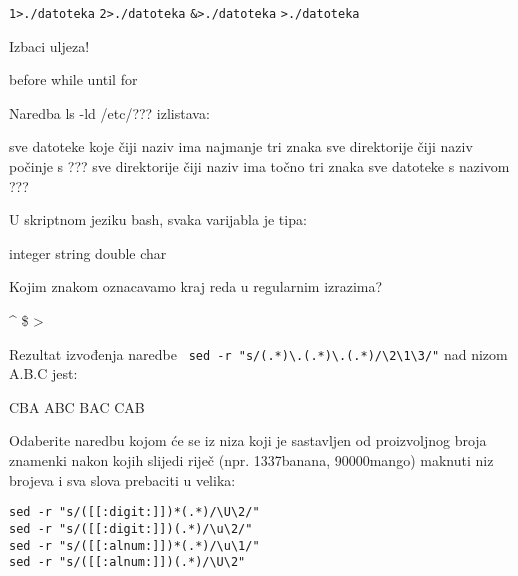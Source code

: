 \documentclass[a4paper,11pt]{exam}
\newcommand{\shell}[1]{\texttt{#1}}
\begin{document}
\begin{questions}
	\begin{oneparchoices}
	  \choice \shell{1>./datoteka} 
		\CorrectChoice \shell{2>./datoteka} 
		\choice \shell{\&>./datoteka} 
		\choice \shell{>./datoteka}
	\end{oneparchoices}
	
	\question
	Izbaci uljeza!
	
	\begin{oneparchoices}
		\CorrectChoice before
		\choice while
		\choice until
		\choice for
	\end{oneparchoices}

	\question
	Naredba ls -ld /etc/??? izlistava:
	\begin{oneparchoices}
		\choice sve datoteke koje čiji naziv ima najmanje tri znaka
		\choice sve direktorije čiji naziv počinje s ???
    \CorrectChoice sve direktorije čiji naziv ima točno tri znaka
	  \choice sve datoteke s nazivom ???
	\end{oneparchoices}
	
	\question
  U skriptnom jeziku bash, svaka varijabla je tipa:
	
	\begin{oneparchoices}
		\choice integer
		\CorrectChoice string
		\choice double
		\choice char
	\end{oneparchoices}
	
	\question
  Kojim znakom oznacavamo kraj reda u regularnim izrazima?

	\begin{oneparchoices}
		\choice \textasciicircum
		\CorrectChoice \$
		\choice >
		\choice *
	\end{oneparchoices}

	\question
	Rezultat izvođenja naredbe \verb| sed -r "s/(.*)\.(.*)\.(.*)/\2\1\3/"| nad nizom A.B.C jest:
	
	\begin{oneparchoices}
		\choice CBA
		\choice ABC
		\CorrectChoice BAC
		\choice CAB
	\end{oneparchoices}
	
	\question
	Odaberite naredbu kojom će se iz niza koji je sastavljen od proizvoljnog broja znamenki nakon kojih slijedi riječ (npr. 1337banana, 90000mango) maknuti niz brojeva i sva slova prebaciti u velika:

	\begin{oneparchoices}
		\CorrectChoice \verb|sed -r "s/([[:digit:]])*(.*)/\U\2/"| \\ 
		\choice \verb|sed -r "s/([[:digit:]])(.*)/\u\2/"|  \\
		\choice \verb|sed -r "s/([[:alnum:]])*(.*)/\u\1/"| \\
		\choice \verb|sed -r "s/([[:alnum:]])(.*)/\U\2"| 
	\end{oneparchoices}



\end{questions}
\end{document}
